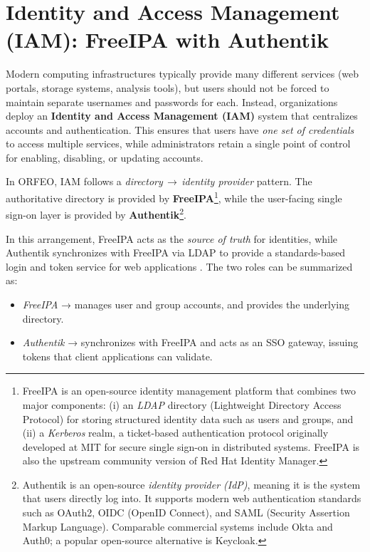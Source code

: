 \section{Identity and Access Management (IAM): FreeIPA with Authentik}

Modern computing infrastructures typically provide many different services 
(web portals, storage systems, analysis tools), but users should not be forced 
to maintain separate usernames and passwords for each. Instead, organizations 
deploy an \textbf{Identity and Access Management (IAM)} system that centralizes 
accounts and authentication. This ensures that users have \emph{one set of 
	credentials} to access multiple services, while administrators retain a single 
point of control for enabling, disabling, or updating accounts.

\medskip

In ORFEO, IAM follows a \emph{directory\,$\rightarrow$\,identity provider} 
pattern. The authoritative directory is provided by 
\textbf{FreeIPA}\footnote{%
	FreeIPA is an open-source identity management platform that combines two 
	major components: (i) an \emph{LDAP} directory (Lightweight Directory Access 
	Protocol) for storing structured identity data such as users and groups, and 
	(ii) a \emph{Kerberos} realm, a ticket-based authentication protocol 
	originally developed at MIT for secure single sign-on in distributed systems. 
	FreeIPA is also the upstream community version of Red Hat Identity Manager.}, 
while the user-facing single sign-on layer is provided by 
\textbf{Authentik}\footnote{%
	Authentik is an open-source \emph{identity provider (IdP)}, meaning it is the 
	system that users directly log into. It supports modern web authentication 
	standards such as OAuth2, OIDC (OpenID Connect), and SAML (Security Assertion 
	Markup Language). Comparable commercial systems include Okta and Auth0; a 
	popular open-source alternative is Keycloak.}. 

In this arrangement, FreeIPA acts as the \emph{source of truth} for identities, 
while Authentik synchronizes with FreeIPA via LDAP to provide a standards-based 
login and token service for web applications 
\parencite{Authentik_Docs_LDAP,FreeIPA_Overview}. The two roles can be 
summarized as:

\begin{itemize}
	\item \emph{FreeIPA} → manages user and group accounts, and provides the 
	underlying directory.  
	\item \emph{Authentik} → synchronizes with FreeIPA and acts as an SSO gateway, 
	issuing tokens that client applications can validate.  
\end{itemize}

